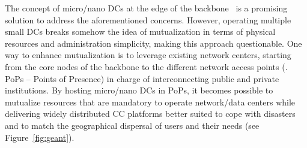%


The concept of micro/nano DCs at the edge of the
backbone~\cite{greenberg:2008} is a promising solution to address the
aforementioned concerns. However, operating multiple small DCs breaks
somehow the idea of mutualization in terms of physical resources and
administration simplicity, making this approach questionable. One way
to enhance mutualization is to leverage existing network centers,
starting from the core nodes of the backbone to the different network
access points (\aka. PoPs – Points of Presence) in charge of
interconnecting public and private institutions.
By hosting micro/nano DCs in PoPs, it becomes possible to mutualize
resources that are mandatory to operate network/data centers while
delivering widely distributed CC platforms better suited to cope with
disasters and to match the geographical dispersal of users and their
needs (see Figure~\ref{fig:geant}).

